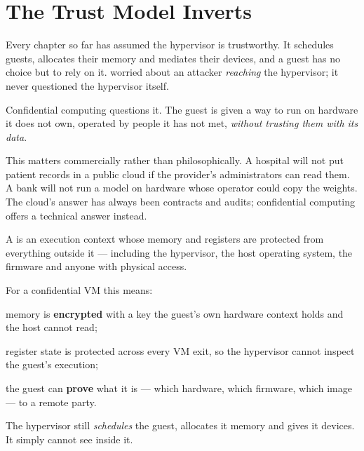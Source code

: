 \section{The Trust Model Inverts}

Every chapter so far has assumed the hypervisor is trustworthy. It schedules
guests, allocates their memory and mediates their devices, and a guest has no
choice but to rely on it.  worried about an attacker
\emph{reaching} the hypervisor; it never questioned the hypervisor itself.

Confidential computing questions it. The guest is given a way to run on
hardware it does not own, operated by people it has not met, \emph{without
trusting them with its data}.

This matters commercially rather than philosophically. A hospital will not put
patient records in a public cloud if the provider's administrators can read
them. A bank will not run a model on hardware whose operator could copy the
weights. The cloud's answer has always been contracts and audits; confidential
computing offers a technical answer instead.

\begin{definitionbox}
A  is an execution context whose memory and registers are protected
from everything outside it --- including the hypervisor, the host operating
system, the firmware and anyone with physical access.

\smallskip
For a confidential VM this means:
\begin{tight}
  \item memory is \textbf{encrypted} with a key the guest's own hardware context
        holds and the host cannot read;
  \item register state is protected across every VM exit, so the hypervisor
        cannot inspect the guest's execution;
  \item the guest can \textbf{prove} what it is --- which hardware, which
        firmware, which image --- to a remote party.
\end{tight}

\smallskip
The hypervisor still \emph{schedules} the guest, allocates it memory and gives
it devices. It simply cannot see inside it.
\end{definitionbox}


